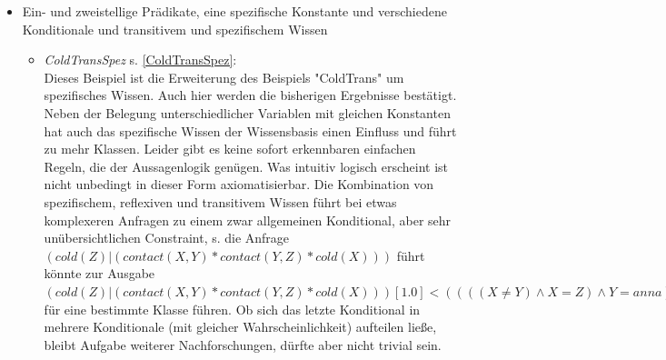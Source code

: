 \documentclass[draft]{scrreprt}
\begin{document}
\begin{itemize}
\begin{itemize}
 Man betrachte das qualitative Konditional $\langle (cold(X) \mid ((contact(X,Y)  \land \\ contact(Y,Z)) \land cold(Z)),  X = Z \rangle$ . Sei cold(Z) (als Teil der Prämisse) wahr. Dann ist $ cold(X) $ (also die Konklusion) auch wahr für X = Z, was nicht weiter überraschend ist, aber an dieser Stelle für erwähnenswert gehalten wurde, da es durchaus für den Entwurf eines regelbasierten Algorithmus relevant sein könnte. Das qualitative Konditional sollte damit wie folgt aussehen: $\langle (cold(X) \mid ((contact(X,Y)  \land contact(Y,Z)) \land cold(Z)) [1.00000],  X = Z \rangle$.\\ Im Ergebnis bleibt zu sagen, dass auch Transitivität zu keinen überraschenden Ergebnissen führt. Lediglich die Belegung unterschiedlicher Variablen mit gleichen Konstanten hat einen erheblichen Einfluss. Ebenso die Gestalt bzw. das Wissen der Anfrage.
\end{itemize}


\item{Ein- und zweistellige Prädikate, eine spezifische Konstante und verschiedene Konditionale und transitivem und spezifischem Wissen}
\begin{itemize}
\item \textsl{ColdTransSpez} \label{BColdTransSpez} s. \ref{ColdTransSpez}:\\
Dieses Beispiel ist die Erweiterung des Beispiels "{}ColdTrans"{} um spezifisches Wissen. Auch hier werden die bisherigen Ergebnisse bestätigt. Neben der Belegung unterschiedlicher Variablen mit gleichen Konstanten hat auch das spezifische Wissen der Wissensbasis einen Einfluss und führt zu mehr Klassen. Leider gibt es keine sofort erkennbaren einfachen Regeln, die der Aussagenlogik genügen. Was intuitiv logisch erscheint ist nicht unbedingt in dieser Form axiomatisierbar. Die Kombination von spezifischem, reflexiven und transitivem Wissen führt bei etwas komplexeren Anfragen zu einem zwar allgemeinen Konditional, aber sehr unübersichtlichen Constraint, s. die Anfrage $ (cold(Z)|(contact(X,Y) * contact(Y,Z) * cold(X))) $ führt könnte zur Ausgabe $ (cold(Z)|(contact(X,Y) * contact(Y,Z) * cold(X)))[1.0]<((((X \neq Y) \land X = Z) \land Y = anna) \lor ( X = Y \land X = Z)) \lor (X = Z \land Z = anna) \land X \neq Y)) \lor (( X \neq anna \land Y \neq anna \land Z \neq anna))> $ für eine bestimmte Klasse führen. Ob sich das letzte Konditional in mehrere Konditionale (mit gleicher Wahrscheinlichkeit) aufteilen ließe, bleibt Aufgabe weiterer Nachforschungen, dürfte aber nicht trivial sein. 
\end{itemize}

\end{itemize}
\end{document}
